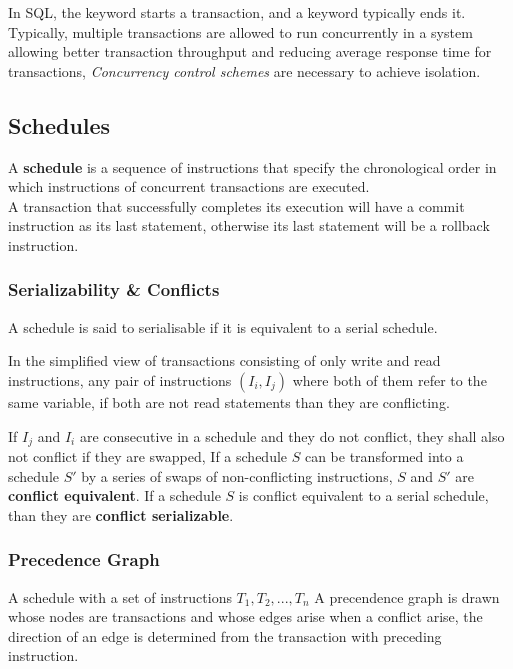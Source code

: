 \documentclass[11pt,a4paper,twocolumn]{book}
\begin{document}
In SQL, the  keyword starts a transaction, and a  keyword typically ends it.\\

Typically, multiple transactions are allowed to run concurrently in a system allowing better transaction throughput and reducing average response time for transactions, \textit{Concurrency control schemes} are necessary to achieve isolation.

\subsection{Schedules}

A \textbf{schedule} is a sequence of instructions that specify the chronological order in which instructions of concurrent transactions are executed.\\

A transaction that successfully completes its execution will have a commit instruction as its last statement, otherwise its last statement will be a rollback instruction.

\subsubsection{Serializability \& Conflicts}

A schedule is said to serialisable if it is equivalent to a serial schedule.

In the simplified view of transactions consisting of only write and read instructions, any pair of instructions $(I_i, I_j)$ where both of them refer to the same variable, if both are not read statements than they are conflicting.

If $I_j$ and $I_i$ are consecutive in a schedule and they do not conflict, they shall also not conflict if they are swapped, If a schedule $S$ can be transformed into a schedule $S'$ by a series of swaps of non-conflicting instructions, $S$ and $S'$ are \textbf{conflict equivalent}. If a schedule $S$ is conflict equivalent to a serial schedule, than they are \textbf{conflict serializable}.

\subsubsection{Precedence Graph}

A schedule with a set of instructions $T_1, T_2, ..., T_n$ A precendence graph is drawn whose nodes are transactions and whose edges arise when a conflict arise, the direction of an edge is determined from the transaction with preceding instruction.\\
\end{document}
